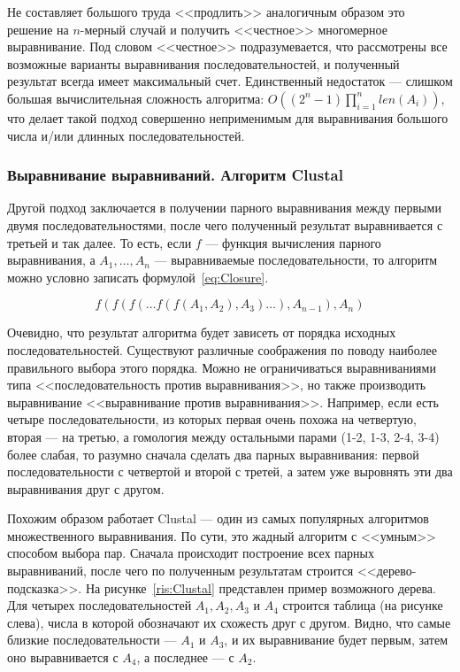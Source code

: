 \indent Не составляет большого труда <<продлить>> аналогичным образом это решение на $n$-мерный случай и получить <<честное>> многомерное выравнивание. Под словом <<честное>> подразумевается, что рассмотрены все возможные варианты выравнивания последовательностей, и полученный результат всегда имеет максимальный счет. Единственный недостаток --- слишком большая вычислительная сложность алгоритма: $O((2^n-1)\prod\limits_{i=1}^nlen(A_i))$, что делает такой подход совершенно неприменимым для выравнивания большого числа и/или длинных последовательностей. 

\subsubsection[Выравнивание выравниваний. Алгоритм Clustal]{\large Выравнивание выравниваний. Алгоритм Clustal}\label{align-align}
\hspace{\parindent} Другой подход заключается в получении парного выравнивания между первыми двумя последовательностями, после чего полученный результат выравнивается с третьей и так далее. То есть, если $f$ --- функция вычисления парного выравнивания, а $A_1, \ldots ,A_n$ --- выравниваемые последовательности, то алгоритм можно условно записать формулой~\ref{eq:Closure}.

\begin{equation}\label{eq:Closure}
f(f(f(\ldots f(f(A_1, A_2), A_3) \ldots ), A_{n-1}), A_n)
\end{equation} 

\indent Очевидно, что результат алгоритма будет зависеть от порядка исходных последовательностей. Существуют различные соображения по поводу наиболее правильного выбора этого порядка. Можно не ограничиваться выравниваниями типа <<последовательность против выравнивания>>, но также производить выравнивание <<выравнивание против выравнивания>>. Например, если есть четыре последовательности, из которых первая очень похожа на четвертую, вторая --- на третью, а гомология между остальными парами (1-2, 1-3, 2-4, 3-4) более слабая, то разумно сначала сделать два парных выравнивания: первой последовательности с четвертой и второй с третей, а затем уже выровнять эти два выравнивания друг с другом.

\indent Похожим образом работает Clustal --- один из самых популярных алгоритмов множественного выравнивания. По сути, это жадный алгоритм с <<умным>> способом выбора пар. Сначала происходит построение всех парных выравниваний, после чего по полученным результатам строится <<дерево-подсказка>>. На рисунке~\ref{ris:Clustal} представлен пример возможного дерева. Для четырех последовательностей $A_1, A_2, A_3$ и $A_4$ строится таблица (на рисунке слева), числа в которой обозначают их схожесть друг с другом. Видно, что самые близкие последовательности --- $A_1$ и $A_3$, и их выравнивание будет первым, затем оно выравнивается с $A_4$, а последнее --- с $A_2$.

